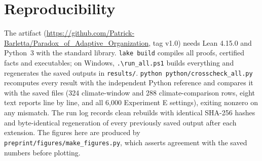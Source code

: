 \documentclass[11pt]{article}
\theoremstyle{plain}
\theoremstyle{definition}
\begin{document}
\section{Reproducibility}
\label{app:repro}

The artifact (\url{https://github.com/Patrick-Barletta/Paradox_of_Adaptive_Organization}, tag v1.0) needs Lean 4.15.0 and Python~3 with the standard library. \texttt{lake build} compiles all proofs, certified facts and executables; on Windows, \texttt{.\textbackslash run\_all.ps1} builds everything and regenerates the saved outputs in \texttt{results/}. \texttt{python python/crosscheck\_all.py} recomputes every result with the independent Python reference and compares it with the saved files (324 climate-window and 288 climate-comparison rows, eight text reports line by line, and all 6,000 Experiment E settings), exiting nonzero on any mismatch. The run log records clean rebuilds with identical SHA-256 hashes and byte-identical regeneration of every previously saved output after each extension. The figures here are produced by \texttt{preprint/figures/make\_figures.py}, which asserts agreement with the saved numbers before plotting.
\end{document}
